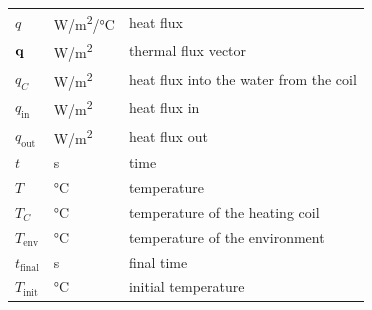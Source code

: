 \documentclass[12pt]{article}
\begin{document}
\begin{longtable*}{l l p{12cm}}
  $q$ & \si[per-mode=symbol] {\watt \per \square \metre \per \celsius} & heat
  flux
  \\
  $\bf{q}$ & \si[per-mode=symbol] {\watt\per\square\metre} & thermal flux vector
  \\
  $q_C$ & \si[per-mode=symbol] {\watt\per\square\metre} & heat flux into the water from the coil
  \\
  $q_\text{in}$ & \si[per-mode=symbol] {\watt\per\square\metre} & heat flux in
  \\ 
  $q_\text{out}$ & \si[per-mode=symbol] {\watt\per\square\metre} & heat flux out
  \\
  $t$ & \si[per-mode=symbol] {\second} & time
  \\
  $T$ & \si[per-mode=symbol] {\celsius} & temperature
  \\
  $T_C$ &\si[per-mode=symbol] {\celsius} & temperature of the heating coil
  \\
  $T_\text{env}$ & \si[per-mode=symbol] {\celsius} & temperature of the environment
  \\ 
  $t_\text{final}$ & \si[per-mode=symbol] {\second} & final time
  \\ 
  $T_\text{init}$ & \si[per-mode=symbol] {\celsius} & initial temperature
  \\

\end{longtable*}
\end{document}
